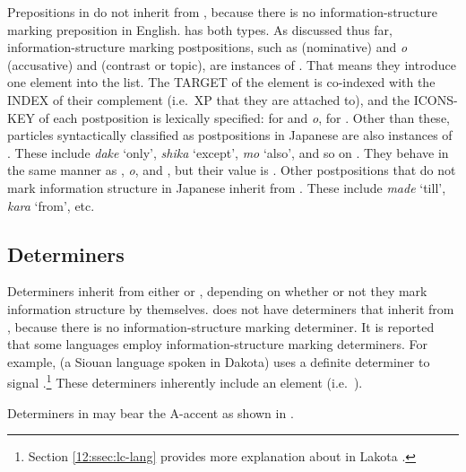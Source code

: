 Prepositions in  do not inherit from
, because there is no information-structure
marking preposition in English.   has both types. As
discussed thus far, information-structure marking postpositions, such
as {\ga} (nominative) and \textit{o} (accusative) and {\wa} (contrast
or topic), are instances of
. That means they introduce one element into
the  list. The TARGET of the  element is
co-indexed with the INDEX of their complement (i.e.\ XP that they are
attached to), and the ICONS-KEY of each postposition is lexically
specified:  for {\ga} and \textit{o},
 for \wa.  Other than these, 
particles syntactically classified as postpositions in Japanese are
also instances of .  These include
\textit{dake} `only', \textit{shika} `except', \textit{mo} `also', and
so on \citep{hasegawa:11,hasegawa:koenig:11}. They behave in the same
manner as {\ga}, \textit{o}, and {\wa}, but their  value
is . Other postpositions that do not
mark information structure in Japanese inherit from
. These include \textit{made} `till',
\textit{kara} `from', etc.





\subsection{Determiners}
\label{10:sssec:determiners}


Determiners inherit from either  or
, depending on whether or not they mark
information structure by themselves.   does not have
determiners that inherit from , because there
is no information-structure marking determiner.  It is reported that
some languages employ information-structure marking determiners. For
example,  (a Siouan language spoken in Dakota) uses a
definite determiner \textit{}
to signal .\footnote{Section \ref{12:ssec:lc-lang}
provides more explanation about
  \textit{} in Lakota .}
These determiners inherently include an  element
(i.e.\ ).


Determiners in  may bear the A-accent as shown in
.

